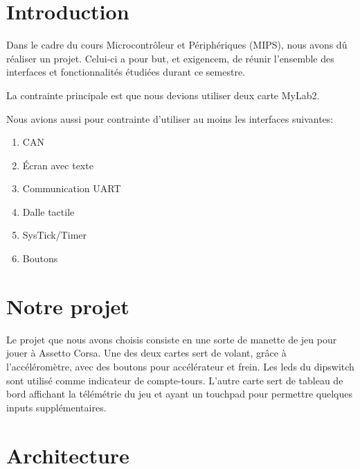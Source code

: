 \documentclass[french, 11pt]{article}
\newcommand{\blankpage}
{
	\null
	\thispagestyle{empty}
	\addtocounter{page}{-1}
	\newpage
}
\begin{document}
	\blankpage

    \section{Introduction}

    Dans le cadre du cours Microcontrôleur et Périphériques (MIPS), nous avons dû réaliser un projet. Celui-ci a pour but, et exigencem, de réunir l'ensemble des interfaces et fonctionnalités étudiées durant ce semestre.

    La contrainte principale est que nous devions utiliser deux carte MyLab2.

    Nous avions aussi pour contrainte d'utiliser au moins les interfaces suivantes:

    \begin{enumerate}
        \item CAN
        \item Écran avec texte
        \item Communication UART
        \item Dalle tactile
        \item SysTick/Timer
        \item Boutons
    \end{enumerate}

    \section{Notre projet}

    Le projet que nous avons choisis consiste en une sorte de manette de jeu pour jouer à Assetto Corsa. Une des deux cartes sert de volant, grâce à l'accéléromètre, avec des boutons pour accélérateur et frein. Les leds du dipswitch sont utilisé comme indicateur de compte-tours. L'autre carte sert de tableau de bord affichant la télémétrie du jeu et ayant un touchpad pour permettre quelques inputs supplémentaires.

    \section{Architecture}
\end{document}
